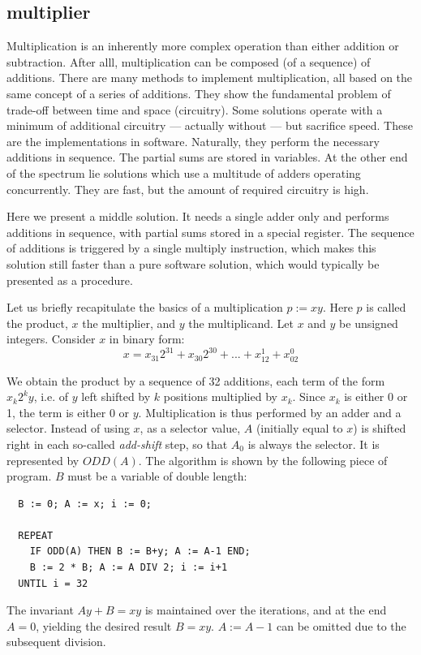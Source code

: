 \subsection{multiplier}
Multiplication is an inherently more complex operation than either addition or subtraction. After
alll, multiplication can be composed (of a sequence) of additions. There are many methods to
implement multiplication, all based on the same concept of a series of additions. They show the
fundamental problem of trade-off between time and space (circuitry). Some solutions operate with
a minimum of additional circuitry — actually without — but sacrifice speed. These are the
implementations in software. Naturally, they perform the necessary additions in sequence. The
partial sums are stored in variables. At the other end of the spectrum lie solutions which use a
multitude of adders operating concurrently. They are fast, but the amount of required circuitry is
high.

Here we present a middle solution. It needs a single adder only and performs additions in sequence,
with partial sums stored in a special register. The sequence of additions is triggered by a single
multiply instruction, which makes this solution still faster than a pure software solution, which
would typically be presented as a procedure.

Let us briefly recapitulate the basics of a multiplication $p := x y$. Here $p$ is called the
product, $x$ the multiplier, and $y$ the multiplicand. Let $x$ and $y$ be unsigned integers.
Consider $x$ in binary form:
\[ x = x_{31}2^{31} + x_{30}2^{30} +...+ x_12^1 + x_02^0 \]

We obtain the product by a sequence of 32 additions, each term of the form $x_k2^ky$, i.e. of $y$
left shifted by $k$ positions multiplied by $x_k$. Since $x_k$ is either 0 or 1, the term is either
0 or $y$. Multiplication is thus performed by an adder and a selector. Instead of using $x$, as a
selector value, $A$ (initially equal to $x$) is shifted right in each so-called \emph{add-shift}
step, so that $A_0$ is always the selector. It is represented by $ODD(A)$. The algorithm is shown
by the following piece of program. $B$ must be a variable of double length:
\begin{verbatim}
  B := 0; A := x; i := 0;

  REPEAT
    IF ODD(A) THEN B := B+y; A := A-1 END;
    B := 2 * B; A := A DIV 2; i := i+1
  UNTIL i = 32
\end{verbatim}

The invariant $Ay + B = xy$ is maintained over the iterations, and at the end $A = 0$, yielding the
desired result $B = xy$. $A := A\!-\!1$ can be omitted due to the subsequent division.

